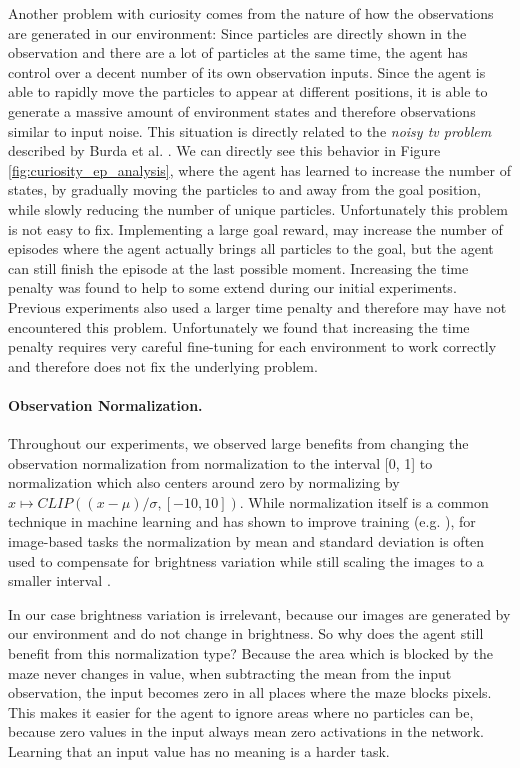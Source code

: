 Another problem with curiosity comes from the nature of how the observations are generated in our environment: Since particles are directly shown in the observation and there are a lot of particles at the same time, the agent has control over a decent number of its own observation inputs. Since the agent is able to rapidly move the particles to appear at different positions, it is able to generate a massive amount of environment states and therefore observations similar to input noise. This situation is directly related to the \textit{noisy tv problem} described by Burda et al. \cite{burda2018large}. We can directly see this behavior in Figure \ref{fig:curiosity_ep_analysis}, where the agent has learned to increase the number of states, by gradually moving the particles to and away from the goal position, while slowly reducing the number of unique particles. Unfortunately this problem is not easy to fix. Implementing a large goal reward, may increase the number of episodes where the agent actually brings all particles to the goal, but the agent can still finish the episode at the last possible moment. Increasing the time penalty was found to help to some extend during our initial experiments. Previous experiments \cite{huang2019,becker2020} also used a larger time penalty and therefore may have not encountered this problem. Unfortunately we found that increasing the time penalty requires very careful fine-tuning for each environment to work correctly and therefore does not fix the underlying problem.

\paragraph{Observation Normalization. } Throughout our experiments, we observed large benefits from changing the observation normalization from normalization to the interval [0, 1] to normalization which also centers around zero by normalizing by $x \mapsto CLIP((x - \mu)/\sigma, [-10, 10])$. While normalization itself is a common technique in machine learning and has shown to improve training (e.g. \cite{jayalakshmi2011statistical}), for image-based tasks the normalization by mean and standard deviation is often used to compensate for brightness variation while still scaling the images to a smaller interval \cite{pal2016preprocessing}. 

In our case brightness variation is irrelevant, because our images are generated by our environment and do not change in brightness. So why does the agent still benefit from this normalization type? Because the area which is blocked by the maze never changes in value, when subtracting the mean from the input observation, the input becomes zero in all places where the maze blocks pixels. This makes it easier for the agent to ignore areas where no particles can be, because zero values in the input always mean zero activations in the network. Learning that an input value has no meaning is a harder task.

